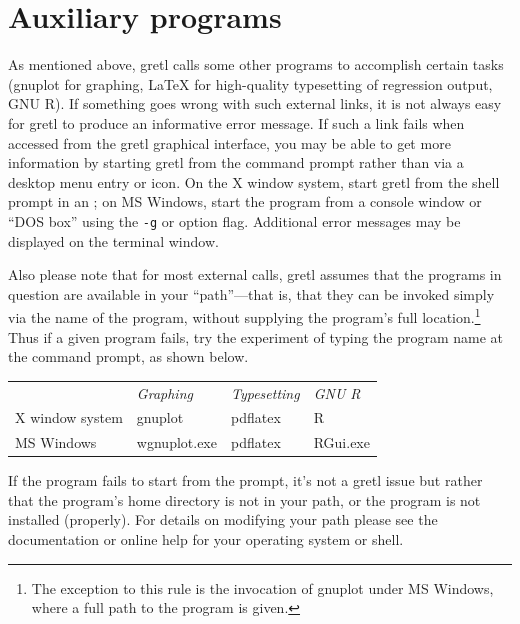\section{Auxiliary programs}
\label{trouble-programs}

As mentioned above, gretl calls some other programs to accomplish
certain tasks (gnuplot for graphing, {\LaTeX} for high-quality
typesetting of regression output, GNU R).  If something goes wrong
with such external links, it is not always easy for gretl to produce
an informative error message.  If such a link fails when accessed from
the gretl graphical interface, you may be able to get more information
by starting gretl from the command prompt rather than via a desktop
menu entry or icon.  On the X window system, start gretl from the
shell prompt in an ; on MS Windows, start the program
 from a console window or ``DOS box'' using the
\verb|-g| or  option flag.  Additional error messages
may be displayed on the terminal window.

Also please note that for most external calls, gretl assumes
that the programs in question are available in your ``path''---that
is, that they can be invoked simply via the name of the program,
without supplying the program's full location.\footnote{The exception
  to this rule is the invocation of gnuplot under MS Windows, where a
  full path to the program is given.}  Thus if a given program fails,
try the experiment of typing the program name at the command prompt,
as shown below.

\begin{center}
  \begin{tabular}{llll}
    & \textit{Graphing} & \textit{Typesetting} & \textit{GNU R}\\
    X window system & gnuplot & pdflatex & R\\
    MS Windows & wgnuplot.exe & pdflatex & RGui.exe\\
  \end{tabular}
\end{center}

If the program fails to start from the prompt, it's not a gretl issue
but rather that the program's home directory is not in your path, or
the program is not installed (properly).  For details on modifying
your path please see the documentation or online help for your
operating system or shell.
    

